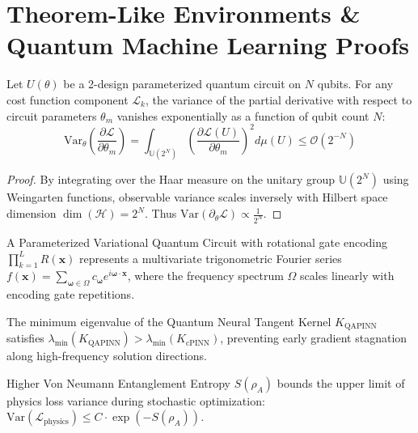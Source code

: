 \documentclass[pdflatex,sn-jnl]{sn-jnl}%
\begin{document}
\section{Theorem-Like Environments \& Quantum Machine Learning Proofs}\label{sec9}
\begin{theorem}\label{thm1}
Let $U(\theta)$ be a 2-design parameterized quantum circuit on $N$ qubits. For any cost function component $\mathcal{L}_k$, the variance of the partial derivative with respect to circuit parameters $\theta_m$ vanishes exponentially as a function of qubit count $N$:
\begin{equation}\label{eq:thm1}
\text{Var}_{\theta} \left( \frac{\partial \mathcal{L}}{\partial \theta_m} \right) = \int_{\mathbb{U}(2^N)} \left( \frac{\partial \mathcal{L}(U)}{\partial \theta_m} \right)^2 d\mu(U) \le \mathcal{O}(2^{-N})
\end{equation}
\end{theorem}
\begin{proof}
By integrating over the Haar measure on the unitary group $\mathbb{U}(2^N)$ using Weingarten functions, observable variance scales inversely with Hilbert space dimension $\dim(\mathcal{H}) = 2^N$. Thus $\text{Var}(\partial_\theta \mathcal{L}) \propto \frac{1}{2^N}$.
\end{proof}

\begin{theorem}\label{thm2}
A Parameterized Variational Quantum Circuit with rotational gate encoding $\prod_{k=1}^L R(\mathbf{x})$ represents a multivariate trigonometric Fourier series $f(\mathbf{x}) = \sum_{\mathbf{\omega} \in \Omega} c_\mathbf{\omega} e^{i \mathbf{\omega} \cdot \mathbf{x}}$, where the frequency spectrum $\Omega$ scales linearly with encoding gate repetitions.
\end{theorem}

\begin{theorem}\label{thm3}
The minimum eigenvalue of the Quantum Neural Tangent Kernel $K_{\text{QAPINN}}$ satisfies $\lambda_{\min}(K_{\text{QAPINN}}) > \lambda_{\min}(K_{\text{cPINN}})$, preventing early gradient stagnation along high-frequency solution directions.
\end{theorem}

\begin{theorem}\label{thm4}
Higher Von Neumann Entanglement Entropy $S(\rho_A)$ bounds the upper limit of physics loss variance during stochastic optimization: $\text{Var}(\mathcal{L}_{\text{physics}}) \le C \cdot \exp(-S(\rho_A))$.
\end{theorem}
\end{document}
